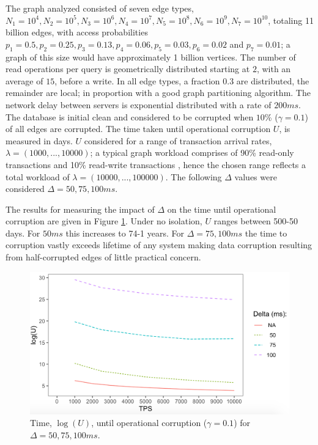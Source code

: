 \documentclass[sigplan,10pt]{acmart}
\begin{document}
The graph analyzed consisted of seven edge types, $N_1=10^4, N_2=10^5, N_3=10^6, N_4=10^7,  N_5=10^8, N_6=10^9, N_7=10^{10}$, totaling 11 billion edges, with access probabilities $p_1 =0.5, p_2 =0.25, p_3=0.13, p_4=0.06, p_5=0.03, p_6=0.02$ and $p_7 =0.01$; a graph of this size would have approximately 1 billion vertices. The number of read operations per query is geometrically distributed starting at $2$, with an average of $15$, before a write. In all edge types, a fraction $0.3$ are distributed, the remainder are local; in proportion with a good graph partitioning algorithm. The network delay between servers is exponential distributed with a rate of $200ms$. The database is initial clean and considered to be corrupted when $10$\% ($\gamma = 0.1$) of all edges are corrupted. The time taken until operational corruption $U$, is measured in days. $U$ considered for a range of transaction arrival rates, $\lambda = (1000, ..., 10000)$; a typical graph workload comprises of 90\% read-only transactions and 10\% read-write transactions \cite{Angles2020}, hence the chosen range reflects a total workload of $\lambda = (10000, ..., 100000)$. The following $\Delta$ values were considered $\Delta = 50, 75, 100ms$.

The results for measuring the impact of $\Delta$ on the time until operational corruption are given in Figure \ref{time-to-corruption-results}. Under no isolation, $U$ ranges between 500-50 days. For $50ms$ this increases to 74-1 years. For $\Delta = 75, 100ms$ the time to corruption vastly exceeds lifetime of any system making data corruption resulting from half-corrupted edges of little practical concern.

\begin{figure}[h]
  \centering
  \includegraphics[width=\linewidth]{./images/delta_50_75_100}
  \caption{Time, $\log(U)$, until operational corruption ($\gamma = 0.1$) for $\Delta = 50, 75, 100ms$.}
  \label{time-to-corruption-results}
\end{figure}
\end{document}
